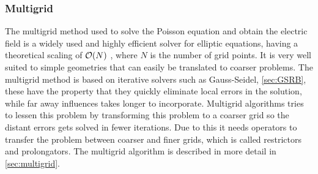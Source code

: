     \subsubsection{Multigrid}

        The multigrid method used to solve the Poisson equation and obtain the
        electric field is a widely used and highly efficient solver for elliptic equations,
        having a theoretical scaling of \(\order{N}\) \citep{press_numerical_1988},
        where \(N\) is the number of grid points. It is very well suited to simple geometries
        that can easily be translated to coarser problems.
        The multigrid method is based on iterative
        solvers such as Gauss-Seidel, \cref{sec:GSRB}, these have the property
        that they quickly eliminate local errors in the solution, while far
        away influences takes longer to incorporate. Multigrid algorithms tries
        to lessen this problem by transforming this problem to a coarser grid
        so the distant errors gets solved in fewer iterations. Due to this it needs
        operators to transfer the problem between coarser and finer grids, which
        is called restrictors and prolongators. The multigrid algorithm is described in
        more detail in \cref{sec:multigrid}.
